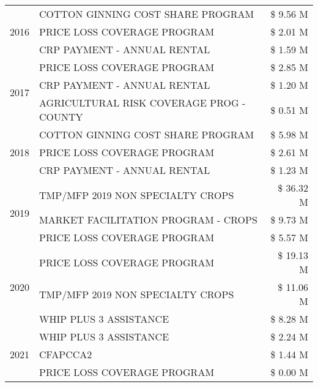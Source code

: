 \begin{tabular}{llr}
\cline{1-3}
\multirow[t]{3}{*}{2016} & COTTON GINNING COST SHARE PROGRAM & \$ 9.56 M \\
 & PRICE LOSS COVERAGE PROGRAM & \$ 2.01 M \\
 & CRP PAYMENT - ANNUAL RENTAL & \$ 1.59 M \\
\cline{1-3}
\multirow[t]{3}{*}{2017} & PRICE LOSS COVERAGE PROGRAM & \$ 2.85 M \\
 & CRP PAYMENT - ANNUAL RENTAL & \$ 1.20 M \\
 & AGRICULTURAL RISK COVERAGE PROG - COUNTY & \$ 0.51 M \\
\cline{1-3}
\multirow[t]{3}{*}{2018} & COTTON GINNING COST SHARE PROGRAM & \$ 5.98 M \\
 & PRICE LOSS COVERAGE PROGRAM & \$ 2.61 M \\
 & CRP PAYMENT - ANNUAL RENTAL & \$ 1.23 M \\
\cline{1-3}
\multirow[t]{3}{*}{2019} & TMP/MFP 2019 NON SPECIALTY CROPS & \$ 36.32 M \\
 & MARKET FACILITATION PROGRAM - CROPS & \$ 9.73 M \\
 & PRICE LOSS COVERAGE PROGRAM & \$ 5.57 M \\
\cline{1-3}
\multirow[t]{3}{*}{2020} & PRICE LOSS COVERAGE PROGRAM & \$ 19.13 M \\
 & TMP/MFP 2019 NON SPECIALTY CROPS & \$ 11.06 M \\
 & WHIP PLUS 3 ASSISTANCE & \$ 8.28 M \\
\cline{1-3}
\multirow[t]{3}{*}{2021} & WHIP PLUS 3 ASSISTANCE & \$ 2.24 M \\
 & CFAPCCA2 & \$ 1.44 M \\
 & PRICE LOSS COVERAGE PROGRAM & \$ 0.00 M \\
\cline{1-3}
\bottomrule
\end{tabular}
